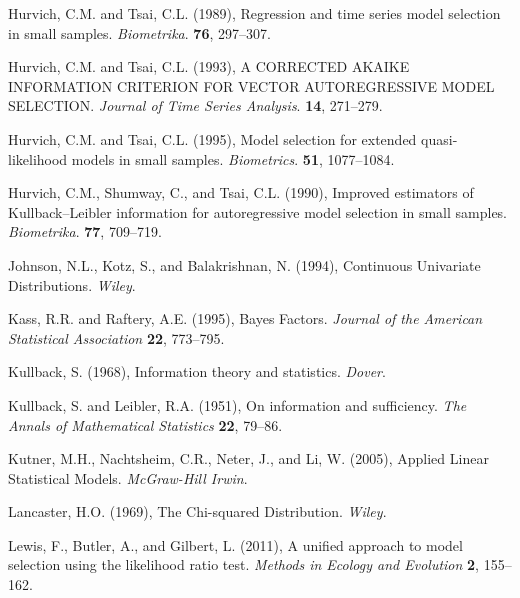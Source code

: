 \phantom{a}

\rff Hurvich, C.M. and Tsai, C.L. (1989),
      Regression and time series model selection in small samples.
      {\it Biometrika}.
      {\bf 76}, {297--307}.

\phantom{a}

\rff Hurvich, C.M. and Tsai, C.L. (1993),
      A CORRECTED AKAIKE INFORMATION CRITERION FOR VECTOR AUTOREGRESSIVE MODEL SELECTION.
      {\it Journal of Time Series Analysis}.
      {\bf 14}, {271--279}.

\phantom{a}

\rff Hurvich, C.M. and Tsai, C.L. (1995),
      Model selection for extended quasi-likelihood models in small samples.
      {\it Biometrics}.
      {\bf 51}, {1077--1084}.

\phantom{a}

\rff Hurvich, C.M., Shumway, C., and Tsai, C.L. (1990),
      Improved estimators of Kullback–Leibler information for autoregressive model selection in small samples.
      {\it Biometrika}.
      {\bf 77}, {709--719}.

\phantom{a}

\rff Johnson, N.L., Kotz, S., and Balakrishnan, N. (1994),
      Continuous Univariate Distributions.
      {\it Wiley}.

\phantom{a}

\rff Kass, R.R. and Raftery, A.E. (1995),
     Bayes Factors.
     {\it Journal of the American Statistical Association}
     {\bf 22}, {773--795}.

\phantom{a}

\rff Kullback, S. (1968),
      Information theory and statistics.
      {\it Dover}.

\phantom{a}

\rff Kullback, S. and Leibler, R.A. (1951),
     On information and sufficiency.
     {\it The Annals of Mathematical Statistics}
     {\bf 22}, {79--86}.

\phantom{a}

\rff Kutner, M.H., Nachtsheim, C.R., Neter, J., and Li, W. (2005),
      Applied Linear Statistical Models.
      {\it McGraw-Hill Irwin}.

\phantom{a}

\rff Lancaster, H.O. (1969),
      The Chi-squared Distribution.
     {\it Wiley}.

\phantom{a}

\rff Lewis, F., Butler, A., and Gilbert, L. (2011),
      A unified approach to model selection using the likelihood ratio test.
      {\it Methods in Ecology and Evolution}
      {\bf 2}, {155--162}.


